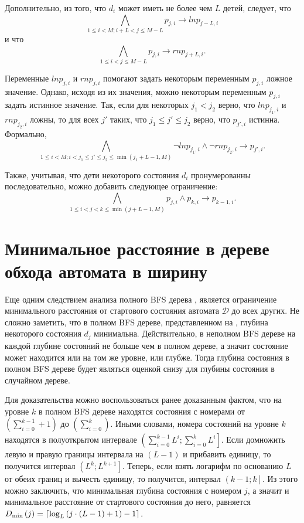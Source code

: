 Дополнительно, из того, что $d_{i}$ может иметь не более чем $L$ детей, следует, что $$\bigwedge_{1 \leq i < M; i + L < j \leq M - L} p_{j,i} \rightarrow \mathit{lnp}_{j - L, i}$$ и что $$\bigwedge_{1 \leq i < j \leq M - L} p_{j,i} \rightarrow \mathit{rnp}_{j + L, i}.$$

Переменные $\mathit{lnp}_{j,i}$ и $\mathit{rnp}_{j,i}$ помогают задать некоторым переменным $p_{j,i}$ ложное значение.
Однако, исходя из их значения, можно некоторым переменным $p_{j,i}$ задать истинное значение.
Так, если для некоторых $j_{1} < j_{2}$ верно, что $\mathit{lnp}_{j_{1}, i}$ и $\mathit{rnp}_{j_{2}, i}$ ложны, то для всех $j'$ таких, что $j_{1} \leq j' \leq j_{2}$ верно, что $p_{j',i}$ истинна.
Формально, $$\bigwedge_{1 \leq i < M;i < j_{1} \leq j' \leq j_{2} \leq \min\left(j_{1} + L - 1, M\right)} \neg \mathit{lnp}_{j_{1},i} \wedge \neg \mathit{rnp}_{j_{2},i} \rightarrow p_{j',i}.$$

Также, учитывая, что дети некоторого состояния $d_{i}$ пронумерованны последовательно, можно добавить следующее ограничение: $$\bigwedge_{1 \leq i < j < k \leq \min(j + L - 1, M)} p_{j,i} \wedge p_{k,i} \rightarrow p_{k - 1, i}.$$ 


\section{Минимальное расстояние в дереве обхода автомата в ширину}
\label{sec:pruning:bfs-distance}

Еще одним следствием анализа полного BFS дерева , является ограничение минимального расстояния от стартового состояния автомата $\mathcal{D}$ до всех других.
Не сложно заметить, что в полном BFS дереве, представленном на , глубина некоторого состояния $d_{j}$ минимальна.
Действительно, в неполном BFS дереве на каждой глубине состояний не больше чем в полном дереве, а значит состояние может находится или на том же уровне, или глубже. 
Тогда глубина состояния в полном BFS дереве будет являться оценкой снизу для глубины состояния в случайном дереве.

Для доказательства можно воспользоваться ранее доказанным фактом, что на уровне $k$ в полном BFS дереве находятся состояния с номерами от $\left(\sum_{i = 0}^{k - 1} + 1\right)$ до $\left(\sum_{i = 0}^{k}\right)$.
Иными словами, номера состояний на уровне $k$ находятся в полуоткрытом интервале $\left(\sum_{i = 0}^{k - 1}L^{i};\sum_{i = 0}^{k}L^{i}\right]$.
Если домножить левую и правую границы интервала на $(L - 1)$ и прибавить единицу, то получится интервал $\left(L^{k};L^{k + 1}\right]$.
Теперь, если взять логарифм по основанию $L$ от обеих границ и вычесть единицу, то получится, интервал $\left(k - 1; k\right]$.
Из этого можно заключить, что минимальная глубина состояния с номером $j$, а значит и минимальное расстояние от стартового состояния до него, равняется $D_{\min}\left(j\right) = \ceil*{\log_{L}\left(j \cdot \left(L - 1\right) + 1\right) - 1}$.

